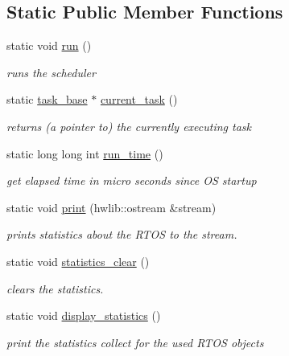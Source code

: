 \subsection*{Static Public Member Functions}
\begin{DoxyCompactItemize}
\item 
static void \hyperlink{classrtos_a68de598a7ba3231db123f26187b31730}{run} ()\hypertarget{classrtos_a68de598a7ba3231db123f26187b31730}{}\label{classrtos_a68de598a7ba3231db123f26187b31730}

\begin{DoxyCompactList}\small\item\em runs the scheduler \end{DoxyCompactList}\item 
static \hyperlink{classrtos_1_1task__base}{task\+\_\+base} $\ast$ \hyperlink{classrtos_a734e414cad1c6295919f2a0dc91095bf}{current\+\_\+task} ()\hypertarget{classrtos_a734e414cad1c6295919f2a0dc91095bf}{}\label{classrtos_a734e414cad1c6295919f2a0dc91095bf}

\begin{DoxyCompactList}\small\item\em returns (a pointer to) the currently executing task \end{DoxyCompactList}\item 
static long long int \hyperlink{classrtos_a9fa9fe484fd9f8d4f214d49b90fbd8c0}{run\+\_\+time} ()\hypertarget{classrtos_a9fa9fe484fd9f8d4f214d49b90fbd8c0}{}\label{classrtos_a9fa9fe484fd9f8d4f214d49b90fbd8c0}

\begin{DoxyCompactList}\small\item\em get elapsed time in micro seconds since OS startup \end{DoxyCompactList}\item 
static void \hyperlink{classrtos_a89f20236423a5523ee6630613bf3d294}{print} (hwlib\+::ostream \&stream)\hypertarget{classrtos_a89f20236423a5523ee6630613bf3d294}{}\label{classrtos_a89f20236423a5523ee6630613bf3d294}

\begin{DoxyCompactList}\small\item\em prints statistics about the R\+T\+OS to the stream. \end{DoxyCompactList}\item 
static void \hyperlink{classrtos_a198f307ddbc304e887f629af0ee50e96}{statistics\+\_\+clear} ()
\begin{DoxyCompactList}\small\item\em clears the statistics. \end{DoxyCompactList}\item 
static void \hyperlink{classrtos_a072d657cb03a117e8c7f42d632990e7b}{display\+\_\+statistics} ()\hypertarget{classrtos_a072d657cb03a117e8c7f42d632990e7b}{}\label{classrtos_a072d657cb03a117e8c7f42d632990e7b}

\begin{DoxyCompactList}\small\item\em print the statistics collect for the used R\+T\+OS objects \end{DoxyCompactList}\end{DoxyCompactItemize}
